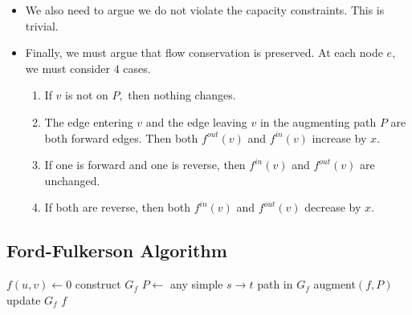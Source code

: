 \documentclass[a4paper,12pt]{article}
\begin{document}
\begin{itemize}
    \item We also need to argue we do not violate the capacity constraints. This is trivial.
    \item Finally, we must argue that flow conservation is preserved. At each node $e,$ we must consider $4$ cases. \begin{enumerate}
        \item If $v$ is not on $P,$ then nothing changes.
        \item The edge entering $v$ and the edge leaving $v$ in the augmenting path $P$ are both forward edges. Then both $f^{out}(v)$ and $f^{in}(v)$ increase by $x.$
        \item If one is forward and one is reverse, then $f^{in}(v)$ and $f^{out}(v)$ are unchanged.
        \item If both are reverse, then both $f^{in}(v)$ and $f^{out}(v)$ decrease by $x.$
    \end{enumerate}
\end{itemize}
\subsection{Ford-Fulkerson Algorithm}
\begin{algorithmic}[1]
            \State $f(u,v)\leftarrow 0$
        \EndForeach
        \State construct $G_f$
            \State $P\gets$ any simple $s\to t$ path in $G_f$
            \State augment$(f,P)$
            \State update $G_f$
        \EndWhile
        \Return $f$
    \EndProcedure
\end{algorithmic}
\end{document}
